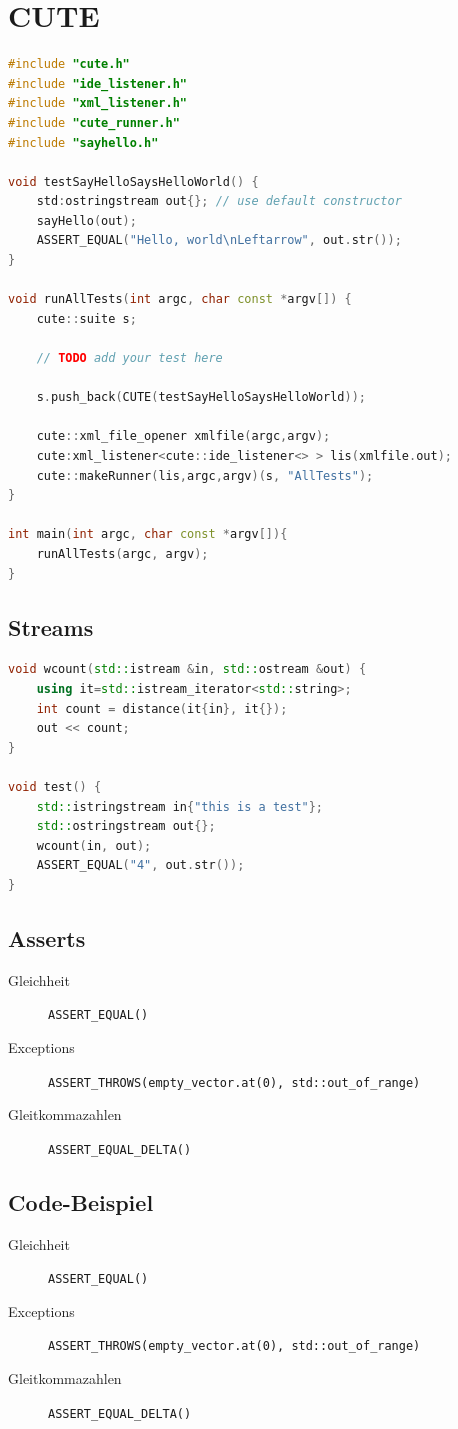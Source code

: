 \section{CUTE}
\begin{lstlisting}[language=C++, caption=Basic CUTE Test File]
#include "cute.h"
#include "ide_listener.h"
#include "xml_listener.h"
#include "cute_runner.h"
#include "sayhello.h"

void testSayHelloSaysHelloWorld() {
	std:ostringstream out{}; // use default constructor
	sayHello(out);
	ASSERT_EQUAL("Hello, world\nLeftarrow", out.str());
}

void runAllTests(int argc, char const *argv[]) {
	cute::suite s;
	
	// TODO add your test here
	
	s.push_back(CUTE(testSayHelloSaysHelloWorld));
	
	cute::xml_file_opener xmlfile(argc,argv);
	cute:xml_listener<cute::ide_listener<> > lis(xmlfile.out);
	cute::makeRunner(lis,argc,argv)(s, "AllTests");
}

int main(int argc, char const *argv[]){
	runAllTests(argc, argv);
}
\end{lstlisting}

\subsection{Streams}
\begin{lstlisting}[language=C++, caption=Test IO Stream]
void wcount(std::istream &in, std::ostream &out) {
	using it=std::istream_iterator<std::string>;
	int count = distance(it{in}, it{});
	out << count;
}

void test() {
	std::istringstream in{"this is a test"};
	std::ostringstream out{};
	wcount(in, out);
	ASSERT_EQUAL("4", out.str());
}

\end{lstlisting}

\subsection{Asserts}
\begin{description}
	\item[Gleichheit] \lstinline|ASSERT_EQUAL()|
	\item[Exceptions] \lstinline|ASSERT_THROWS(empty_vector.at(0), std::out_of_range)|
	\item[Gleitkommazahlen] \lstinline|ASSERT_EQUAL_DELTA()|
\end{description}

\subsection{Code-Beispiel}
\begin{description}
	\item[Gleichheit] \lstinline|ASSERT_EQUAL()|
	\item[Exceptions] \lstinline|ASSERT_THROWS(empty_vector.at(0), std::out_of_range)|
	\item[Gleitkommazahlen] \lstinline|ASSERT_EQUAL_DELTA()|
\end{description}


